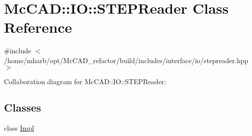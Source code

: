 \hypertarget{classMcCAD_1_1IO_1_1STEPReader}{}\section{Mc\+C\+AD\+:\+:IO\+:\+:S\+T\+E\+P\+Reader Class Reference}
\label{classMcCAD_1_1IO_1_1STEPReader}


{\ttfamily \#include $<$/home/mharb/opt/\+Mc\+C\+A\+D\+\_\+refactor/build/includes/interface/io/stepreader.\+hpp$>$}



Collaboration diagram for Mc\+C\+AD\+:\+:IO\+:\+:S\+T\+E\+P\+Reader\+:
\subsection*{Classes}
\begin{DoxyCompactItemize}
\item 
class \hyperlink{classMcCAD_1_1IO_1_1STEPReader_1_1Impl}{Impl}
\end{DoxyCompactItemize}
